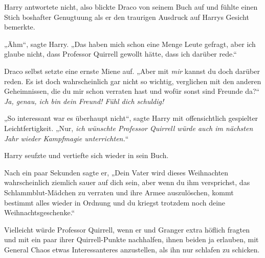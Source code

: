 Harry antwortete nicht, also blickte Draco von seinem Buch auf und fühlte einen Stich boshafter Genugtuung als er den traurigen Ausdruck auf Harrys Gesicht bemerkte.

„Ähm“, sagte Harry. „Das haben mich schon eine Menge Leute gefragt, aber ich glaube nicht, dass Professor Quirrell gewollt hätte, dass ich darüber rede.“

Draco selbst setzte eine ernste Miene auf. „Aber mit \emph{mir} kannst du doch darüber reden. Es ist doch wahrscheinlich gar nicht so wichtig, verglichen mit den anderen Geheimnissen, die du mir schon verraten hast und wofür sonst sind Freunde da?“ \emph{Ja, genau, ich bin dein Freund! Fühl dich schuldig!}

„So interessant war es überhaupt nicht“, sagte Harry mit offensichtlich gespielter Leichtfertigkeit. „Nur, \emph{ich wünschte Professor Quirrell würde auch im nächsten Jahr wieder Kampfmagie unterrichten.}“

Harry seufzte und vertiefte sich wieder in sein Buch.

Nach ein paar Sekunden sagte er, „Dein Vater wird dieses Weihnachten wahrscheinlich ziemlich sauer auf dich sein, aber wenn du ihm versprichst, das Schlammblut-Mädchen zu verraten und ihre Armee auszulöschen, kommt bestimmt alles wieder in Ordnung und du kriegst trotzdem noch deine Weihnachtsgeschenke.“

Vielleicht würde Professor Quirrell, wenn er und Granger extra höflich fragten und mit ein paar ihrer Quirrell-Punkte nachhalfen, ihnen beiden ja erlauben, mit General Chaos etwas Interessanteres anzustellen, als ihn nur schlafen zu schicken.

